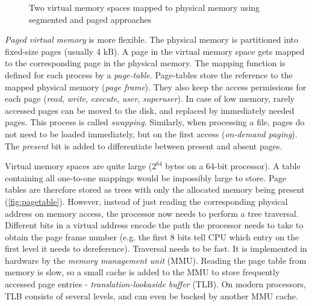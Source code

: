\begin{figure}
  \caption{Two virtual memory spaces mapped to physical memory using segmented
  and paged approaches}
\end{figure}

\emph{Paged virtual memory} is more flexible. The physical memory is partitioned
into fixed-size pages (usually 4 kB). A page in the virtual memory space gets
mapped to the corresponding page in the physical memory. The mapping function is
defined for each process by a \emph{page-table}. Page-tables store the reference
to the mapped physical memory (\emph{page frame}). They also keep
the access permissions for each page (\emph{read}, \emph{write}, \emph{execute},
 \emph{user}, \emph{superuser}). In case of low memory, rarely accessed pages 
can be moved to the disk, and replaced by immediately needed pages. This process
is called \emph{swapping}. Similarly, when processing a file, pages do not need 
to be loaded immediately, but on the first access (\emph{on-demand paging}). The
\emph{present} bit is added to differentiate between present and absent pages.

Virtual memory spaces are quite large ($2^{64}$ bytes on a 64-bit processor). A 
table containing all one-to-one mappings would be impossibly large to store. 
Page tables are therefore stored as trees with only the allocated memory being 
present (\cref{fig:pagetable}). However, instead of just reading the 
corresponding physical address on memory access, the processor now needs to 
perform a tree traversal. Different bits in a virtual address encode the path 
the processor needs to take to obtain the page frame number (e.g. the first 8 
bits tell CPU which entry on the first level it needs to dereference). Traversal
needs to be fast. It is implemented in hardware by the \emph{memory management 
unit} (MMU). Reading the page table from memory is slow, so a small cache is 
added to the MMU to store frequently accessed page entries - 
\emph{translation-lookaside buffer} (TLB). On modern processors, TLB consists of
several levels, and can even be backed by another MMU cache. 


